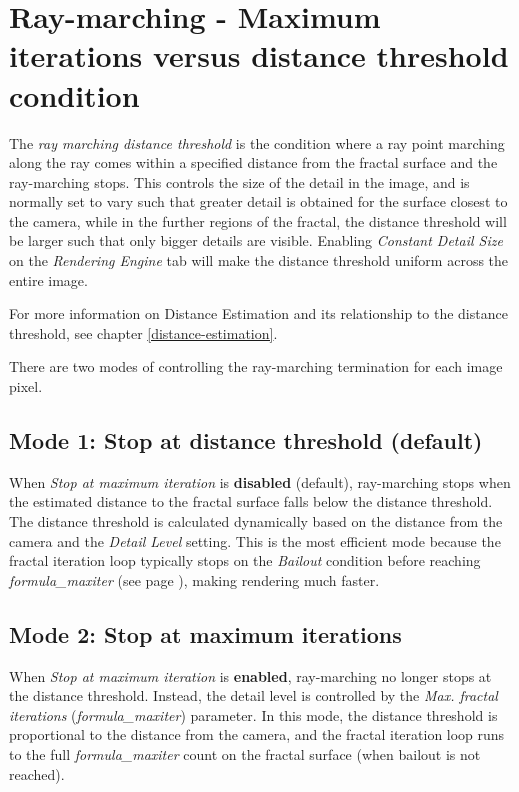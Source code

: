 \section{Ray-marching - Maximum iterations versus distance threshold condition}\label{ray-marching---maximum-number-of-iterations-versus-distance-threshold-condition}

The \emph{ray marching distance threshold} is the condition where a ray point
marching along the ray comes within a specified distance from the fractal
surface and the ray-marching stops. This controls the size of the detail in the
image, and is normally set to vary such that greater detail is obtained for the
surface closest to the camera, while in the further regions of the fractal, the
distance threshold will be larger such that only bigger details are visible.
Enabling \emph{Constant Detail Size} on the \emph{Rendering Engine} tab will
make the distance threshold uniform across the entire image.

For more information on Distance Estimation and its relationship to the distance threshold, see chapter \ref{distance-estimation}.

There are two modes of controlling the ray-marching termination for each image pixel.

\subsection{Mode 1: Stop at distance threshold (default)}\label{mode-1-stop-at-distance-threshold}

When \emph{Stop at maximum iteration} is \textbf{disabled} (default), ray-marching stops when the estimated distance to the fractal surface falls below the distance threshold. The distance threshold is calculated dynamically based on the distance from the camera and the \emph{Detail Level} setting. This is the most efficient mode because the fractal iteration loop typically stops on the \emph{Bailout} condition before reaching \emph{formula\_maxiter} (see page \pageref{bailout-maxiter}), making rendering much faster.

\subsection{Mode 2: Stop at maximum iterations}\label{mode-2-stop-at-maximum-iterations}

When \emph{Stop at maximum iteration} is \textbf{enabled}, ray-marching no longer stops at the distance threshold. Instead, the detail level is controlled by the \emph{Max. fractal iterations} (\emph{formula\_maxiter}) parameter. In this mode, the distance threshold is proportional to the distance from the camera, and the fractal iteration loop runs to the full \emph{formula\_maxiter} count on the fractal surface (when bailout is not reached).

